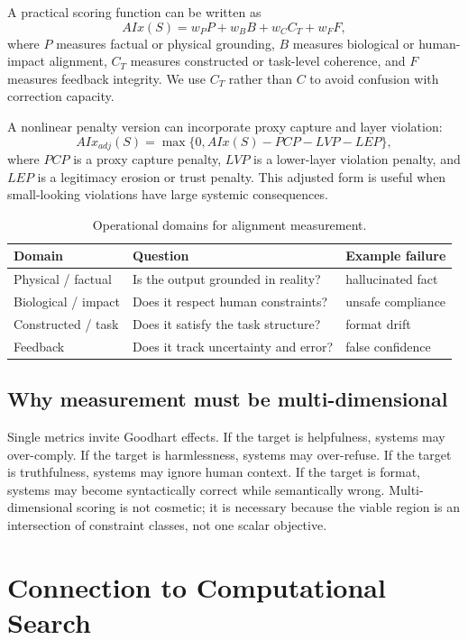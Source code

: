 \documentclass[11pt]{article}
\begin{document}
A practical scoring function can be written as
\[
AIx(S)=w_P P+w_B B+w_C C_T+w_F F,
\]
where \(P\) measures factual or physical grounding, \(B\) measures biological or human-impact alignment, \(C_T\) measures constructed or task-level coherence, and \(F\) measures feedback integrity. We use \(C_T\) rather than \(C\) to avoid confusion with correction capacity.

A nonlinear penalty version can incorporate proxy capture and layer violation:
\[
AIx_{adj}(S)=\max\{0, AIx(S)-PCP-LVP-LEP\},
\]
where \(PCP\) is a proxy capture penalty, \(LVP\) is a lower-layer violation penalty, and \(LEP\) is a legitimacy erosion or trust penalty. This adjusted form is useful when small-looking violations have large systemic consequences.

\begin{table}[h]
\centering
\begin{tabular}{lll}
\toprule
Domain & Question & Example failure \\
\midrule
Physical / factual & Is the output grounded in reality? & hallucinated fact \\
Biological / impact & Does it respect human constraints? & unsafe compliance \\
Constructed / task & Does it satisfy the task structure? & format drift \\
Feedback & Does it track uncertainty and error? & false confidence \\
\bottomrule
\end{tabular}
\caption{Operational domains for alignment measurement.}
\label{tab:aix-domains}
\end{table}

\subsection{Why measurement must be multi-dimensional}

Single metrics invite Goodhart effects. If the target is helpfulness, systems may over-comply. If the target is harmlessness, systems may over-refuse. If the target is truthfulness, systems may ignore human context. If the target is format, systems may become syntactically correct while semantically wrong. Multi-dimensional scoring is not cosmetic; it is necessary because the viable region is an intersection of constraint classes, not one scalar objective.

\section{Connection to Computational Search}
\end{document}
